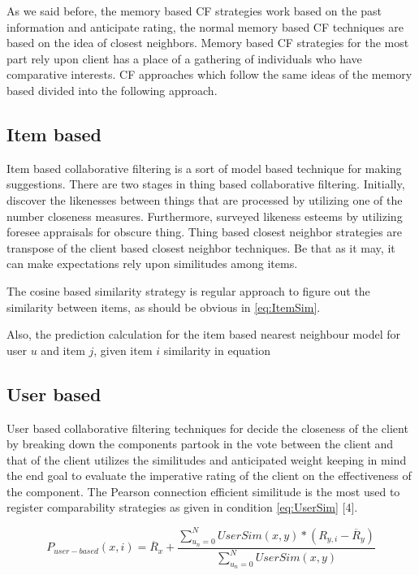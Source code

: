 \documentclass[10pt,conference]{IEEEtran}
\begin{document}
As we said before, the memory based CF strategies work based on the past information and anticipate rating, the normal memory based CF techniques are based on the idea of closest neighbors. Memory based CF strategies for the most part rely upon client has a place of a gathering of individuals who have comparative interests. CF approaches which follow the same ideas of the memory based divided into the following approach.

\subsection{Item based}
Item based collaborative filtering is a sort of model based technique for making suggestions. There are two stages in thing based collaborative filtering. Initially, discover the likenesses between things that are processed by utilizing one of the number closeness measures. Furthermore, surveyed likeness esteems by utilizing foresee appraisals for obscure thing. Thing based closest neighbor strategies are transpose of the client based closest neighbor techniques. Be that as it may, it can make expectations rely upon similitudes among items. 

The cosine based similarity strategy is regular approach to figure out the similarity between items, as should be obvious in \eqref{eq:ItemSim}.

Also, the prediction calculation for the item based nearest neighbour model for user $u$ and item $j$, given item $i$ similarity in equation 






\subsection{User based}
User based collaborative filtering techniques for decide the closeness of the client by breaking down the components partook in the vote between the client and that of the client utilizes the similitudes and anticipated weight keeping in mind the end goal to evaluate the imperative rating of the client on the effectiveness of the component. The Pearson connection efficient similitude is the most used to register comparability strategies as given in condition \eqref{eq:UserSim} [4].


\begin{equation}
P_{user-based}(x,i) = \overline{R}_{x} + \frac{\sum_{u_n = 0}^{N} UserSim(x,y) \ast (R_{y,i}-\overline{R}_{y})}{\sum_{u_n = 0}^{N} UserSim(x,y)}
\end{equation}
\end{document}
